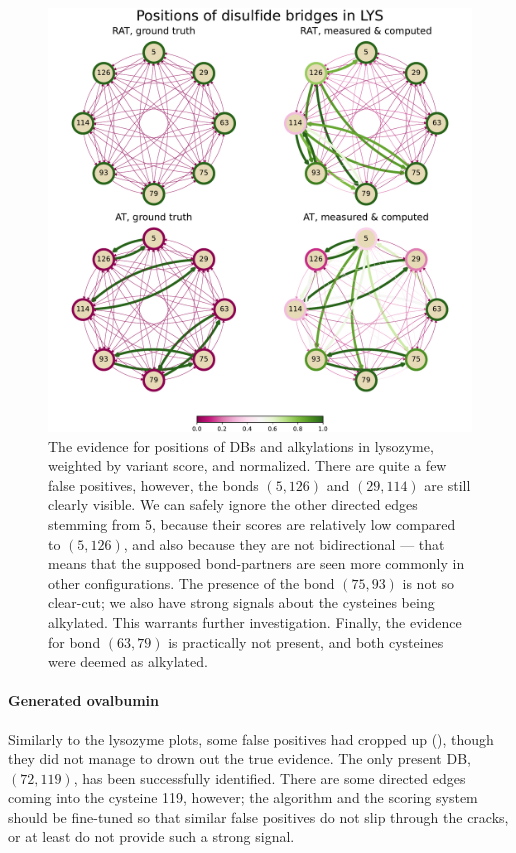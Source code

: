 \begin{figure}
  \centering
  \includegraphics[width=1\linewidth]{img/lys.pdf}
  \caption{The evidence for positions of DBs and alkylations in lysozyme, weighted by variant score, and normalized. There are quite a few false positives, however, the bonds \((5, 126)\) and \((29, 114)\) are still clearly visible. We can safely ignore the other directed edges stemming from 5, because their scores are relatively low compared to \((5, 126)\), and also because they are not bidirectional --- that means that the supposed bond-partners are seen more commonly in other configurations. The presence of the bond \((75, 93)\) is not so clear-cut; we also have strong signals about the cysteines being alkylated. This warrants further investigation. Finally, the evidence for bond \((63, 79)\) is practically not present, and both cysteines were deemed as alkylated.}\label{fig:lys}
\end{figure}

\paragraph{Generated ovalbumin} Similarly to the lysozyme plots, some false positives had cropped up (), though they did not manage to drown out the true evidence. The only present DB, \((72, 119)\), has been successfully identified. There are some directed edges coming into the cysteine 119, however; the algorithm and the scoring system should be fine-tuned so that similar false positives do not slip through the cracks, or at least do not provide such a strong signal.

